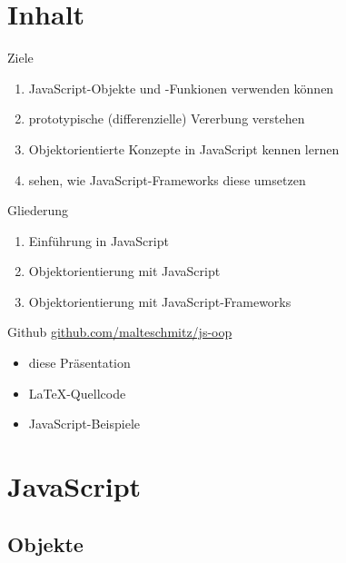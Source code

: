 \section*{Inhalt}

\begin{frame}{Ziele}
  \begin{enumerate}
    \item JavaScript-Objekte und -Funkionen verwenden können
    \item prototypische (differenzielle) Vererbung verstehen
    \item Objektorientierte Konzepte in JavaScript kennen lernen
    \item sehen, wie JavaScript-Frameworks diese umsetzen
  \end{enumerate}
\end{frame}

\begin{frame}{Gliederung}
  \begin{enumerate}[{Teil} I]
    \item Einführung in JavaScript
    \item Objektorientierung mit JavaScript
    \item Objektorientierung mit JavaScript-Frameworks
  \end{enumerate}
\end{frame}

\begin{frame}{Github}
  \url{github.com/malteschmitz/js-oop}
  \begin{itemize}
    \item diese Präsentation
    \item \LaTeX-Quellcode
    \item JavaScript-Beispiele
  \end{itemize}
\end{frame}

\section{JavaScript}

\subsection{Objekte}

